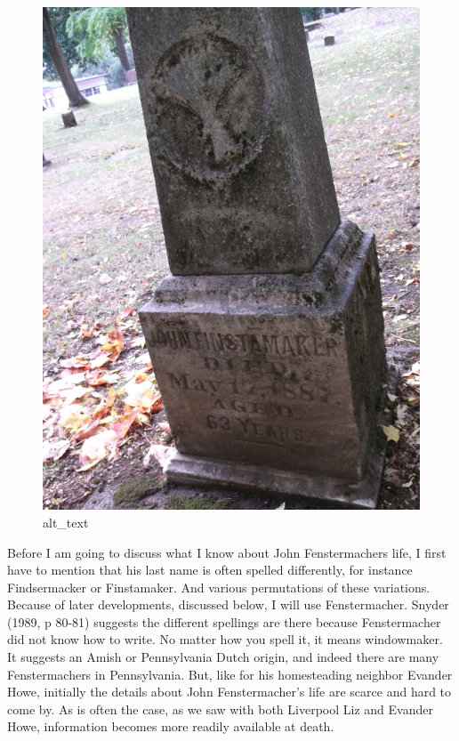 \documentclass[
  12pt,
]{book}
\begin{document}
\begin{figure}
\centering
\includegraphics{images/0204b_images/image1.jpg}
\caption{alt\_text}
\end{figure}

Before I am going to discuss what I know about John Fenstermachers life, I first have to mention that his last name is often spelled differently, for instance Findsermacker or Finstamaker. And various permutations of these variations. Because of later developments, discussed below, I will use Fenstermacher. Snyder (1989, p 80-81) suggests the different spellings are there because Fenstermacher did not know how to write. No matter how you spell it, it means windowmaker. It suggests an Amish or Pennsylvania Dutch origin, and indeed there are many Fenstermachers in Pennsylvania. But, like for his homesteading neighbor Evander Howe, initially the details about John Fenstermacher's life are scarce and hard to come by. As is often the case, as we saw with both Liverpool Liz and Evander Howe, information becomes more readily available at death.
\end{document}
